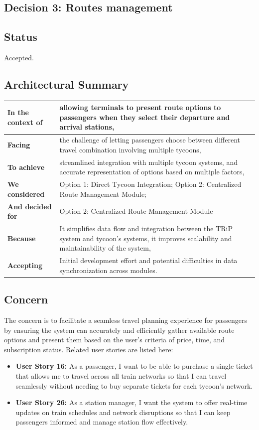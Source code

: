 \subsection{Decision 3: Routes management}

\subsection*{Status}
Accepted.

\subsection*{Architectural Summary}
\begin{tabular}{|p{3.5cm}|p{10.5cm}|}
    \hline
    \textbf{In the context of} & allowing terminals to present route options to passengers when they select their departure and arrival stations, \\
    \hline
    \textbf{Facing} & the challenge of letting passengers choose between different travel combination involving multiple tycoons, \\
    \hline
    \textbf{To achieve} & streamlined integration with multiple tycoon systems, and accurate representation of options based on multiple factors, \\
    \hline
    \textbf{We considered} & Option 1: Direct Tycoon Integration; Option 2: Centralized Route Management Module; \\
    \hline
    \textbf{And decided for} & Option 2: Centralized Route Management Module \\
    \hline
    \textbf{Because} & It simplifies data flow and integration between the TRiP system and tycoon's systems, it improves scalability and maintainability of the system, \\
    \hline
    \textbf{Accepting} & Initial development effort and potential difficulties in data synchronization across modules. \\
    \hline
\end{tabular}

\subsection*{Concern}
The concern is to facilitate a seamless travel planning experience for passengers by ensuring the system can accurately and efficiently gather available route options and present them based on the user's criteria of price, time, and subscription status.
Related user stories are listed here:
\begin{itemize}
    \item \textbf{User Story 16:} As a passenger, I want to be able to purchase a single ticket that allows me to travel across all train networks so that I can travel seamlessly without needing to buy separate tickets for each tycoon's network.
    \item \textbf{User Story 26:} As a station manager, I want the system to offer real-time updates on train schedules and network disruptions so that I can keep passengers informed and manage station flow effectively.
\end{itemize}

